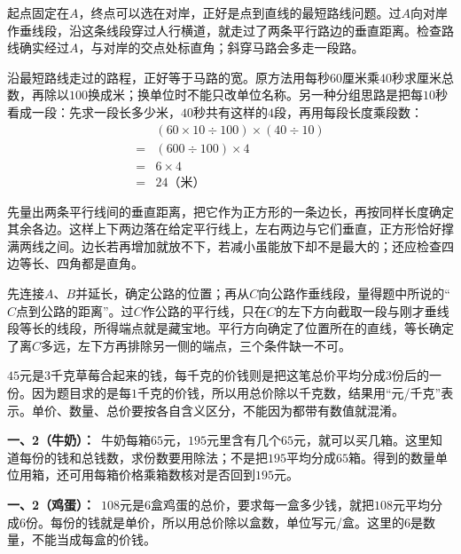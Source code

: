 \documentclass[multi=snippet,border=0pt]{standalone}
\newenvironment{snippet}[3]{\begin{minipage}{#1bp}\color{answerred}\fontsize{#2}{#3}\selectfont\raggedright}{\end{minipage}}
\begin{document}
\begin{snippet}{505}{11.5}{14}起点固定在\(A\)，终点可以选在对岸，正好是点到直线的最短路线问题。过\(A\)向对岸作垂线段，沿这条线段穿过人行横道，就走过了两条平行路边的垂直距离。检查路线确实经过\(A\)，与对岸的交点处标直角；斜穿马路会多走一段路。\end{snippet}
\begin{snippet}{505}{11.5}{14}沿最短路线走过的路程，正好等于马路的宽。原方法用每秒\(60\)厘米乘\(40\)秒求厘米总数，再除以\(100\)换成米；换单位时不能只改单位名称。另一种分组思路是把每\(10\)秒看成一段：先求一段长多少米，\(40\)秒共有这样的\(4\)段，再用每段长度乘段数：\[\begin{aligned}&(60\times10\div100)\times(40\div10)\\={}&(600\div100)\times4\\={}&6\times4\\={}&24\text{（米）}\end{aligned}\]\end{snippet}
\begin{snippet}{505}{11.5}{14}先量出两条平行线间的垂直距离，把它作为正方形的一条边长，再按同样长度确定其余各边。这样上下两边落在给定平行线上，左右两边与它们垂直，正方形恰好撑满两线之间。边长若再增加就放不下，若减小虽能放下却不是最大的；还应检查四边等长、四角都是直角。\end{snippet}
\begin{snippet}{505}{11.5}{14}先连接\(A\)、\(B\)并延长，确定公路的位置；再从\(C\)向公路作垂线段，量得题中所说的“\(C\)点到公路的距离”。过\(C\)作公路的平行线，只在\(C\)的左下方向截取一段与刚才垂线段等长的线段，所得端点就是藏宝地。平行方向确定了位置所在的直线，等长确定了离\(C\)多远，左下方再排除另一侧的端点，三个条件缺一不可。\end{snippet}
\begin{snippet}{505}{11.5}{14}\(45\)元是\(3\)千克草莓合起来的钱，每千克的价钱则是把这笔总价平均分成\(3\)份后的一份。因为题目求的是每\(1\)千克的价钱，所以用总价除以千克数，结果用“元/千克”表示。单价、数量、总价要按各自含义区分，不能因为都带有数值就混淆。\end{snippet}
\begin{snippet}{505}{11.5}{14}\textbf{一、2（牛奶）：}\ 牛奶每箱\(65\)元，\(195\)元里含有几个\(65\)元，就可以买几箱。这里知道每份的钱和总钱数，求份数要用除法；不是把\(195\)平均分成\(65\)箱。得到的数量单位用箱，还可用每箱价格乘箱数核对是否回到\(195\)元。\end{snippet}
\begin{snippet}{505}{11.5}{14}\textbf{一、2（鸡蛋）：}\ \(108\)元是\(6\)盒鸡蛋的总价，要求每一盒多少钱，就把\(108\)元平均分成\(6\)份。每份的钱就是单价，所以用总价除以盒数，单位写元/盒。这里的\(6\)是数量，不能当成每盒的价钱。\end{snippet}
\end{document}

